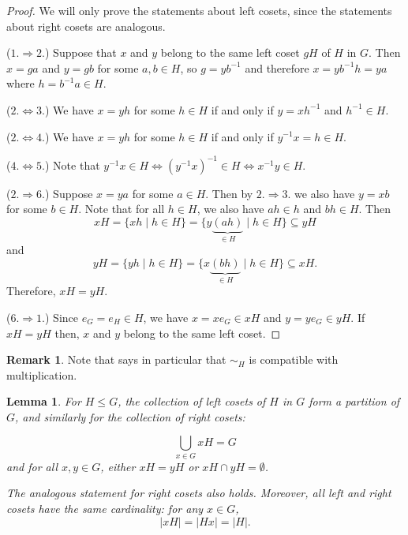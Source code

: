 \documentclass[12pt]{report}
\newtheorem{lemma}[theorem]{Lemma}
\numberwithin{equation}{section}
\numberwithin{theorem}{chapter}
\theoremstyle{definition}
\newtheorem*{basic properties}{Basic Properties}
\newtheorem*{Important Remark}{Important Remark}
\newtheorem{remark}[theorem]{Remark}
\begin{document}
\begin{proof}
We will only prove the statements about left cosets, since the statements about right cosets are analogous.

\vspace{0.4em}

($1. \Rightarrow 2.$) Suppose that $x$ and $y$ belong to the same left coset $gH$ of $H$ in $G$. Then $x=ga$ and $y=gb$ for some $a,b \in H$, so  $g=yb^{-1}$ and therefore $x=yb^{-1}h=ya$ where $h=b^{-1}a\in H$.


\vspace{0.4em}


($2. \Leftrightarrow 3.$) We have $x=yh$ for some $h \in H$ if and only if $y = xh^{-1}$ and $h^{-1} \in H$.


\vspace{0.4em}

($2. \Leftrightarrow 4.$) We have $x=yh$ for some $h \in H$ if and only if $y^{-1} x=h\in H$.

\vspace{0.4em}

($4. \Leftrightarrow 5.$) Note that $y^{-1} x\in H \Leftrightarrow (y^{-1} x)^{-1}\in H \iff x^{-1}y\in H$.

\vspace{0.4em}

($2. \Rightarrow 6.$) Suppose $x = ya$ for some $a \in H$. Then by $2. \Rightarrow 3.$ we also have $y = xb$ for some $b \in H$. Note that for all $h \in H$, we also have $ah \in h$ and $bh \in H$. Then
$$xH= \{xh \mid h \in H\}=\{y\underset{\in H}{\underbrace{(ah)}} \mid h \in H\} \subseteq yH$$
and
$$yH= \{y h\mid h \in H\}=\{x \underset{\in H}{\underbrace{(bh)}} \mid h \in H\} \subseteq xH.$$
Therefore, $xH=yH$.

\vspace{0.4em}

($6. \Rightarrow 1.$) Since $e_G=e_H\in H$, we have $x=xe_G\in xH$ and $y=ye_G\in yH$. If $xH=yH$ then,  $x$ and $y$ belong to the same left coset.
\end{proof}


\begin{remark}
	Note that  says in particular that $\sim_H$ is compatible with multiplication.
\end{remark}



\begin{lemma}\label{coset partition}
For $H \leq G$, the collection of left cosets of $H$ in $G$ form a partition of $G$, and similarly for the collection of right cosets: 

$$\bigcup_{x\in G} xH=G$$
and for all $x,y \in G$, either $xH = yH$ or $xH \cap yH = \emptyset$.

The analogous statement for right cosets also holds.
Moreover, all left and right cosets have the same cardinality: for any $x\in G$,
$$|xH| = |Hx|=|H|.$$ 
\end{lemma}
\end{document}
